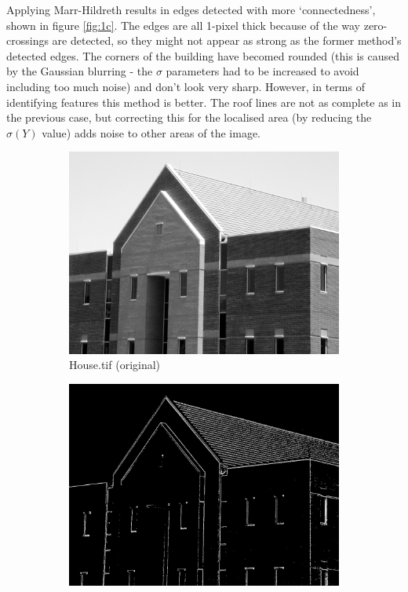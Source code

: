 \documentclass[a4paper]{article}
\begin{document}
Applying Marr-Hildreth results in edges detected with more `connectedness', shown in figure \ref{fig:1c}. The edges are all 1-pixel thick because of the way zero-crossings are detected, so they might not appear as strong as the former method's detected edges. The corners of the building have becomed rounded (this is caused by the Gaussian blurring - the $\sigma$ parameters had to be increased to avoid including too much noise) and don't look very sharp. However, in terms of identifying features this method is better. The roof lines are not as complete as in the previous case, but correcting this for the localised area (by reducing the $\sigma (Y)$ value) adds noise to other areas of the image.
\begin{figure}
    
        \centering
        \begin{subfigure}[b]{0.3\textwidth}
                \centering
                \includegraphics[width=\textwidth]{q1-house-orig.png}
                \caption{House.tif (original)}
                \label{fig:1a}
        \end{subfigure}
        \begin{subfigure}[b]{0.3\textwidth}
                \centering
                \includegraphics[width=\textwidth]{q1-house-mag.png}

\end{subfigure}
\end{figure}
\end{document}
